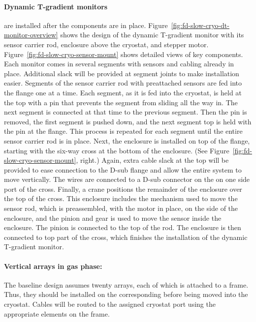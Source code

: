 \paragraph{Dynamic T-gradient monitors} %
are installed
after the  components are in place.
Figure~\ref{fig:fd-slow-cryo-dt-monitor-overview} shows the
design of the dynamic T-gradient monitor with its sensor carrier rod,
enclosure above the cryostat, and stepper motor. 
 Figure~\ref{fig:fd-slow-cryo-sensor-mount} shows detailed views of key
components.  Each monitor %
comes in several segments with sensors
and cabling already in place. Additional slack will be provided at
segment joints to make installation easier. Segments of the sensor
carrier rod with preattached sensors %
are fed into the flange one
at a time. Each segment, as it is fed into the %
cryostat, is %
held at the top with a pin that prevents the segment from sliding all
the way in. %
The next segment %
is connected at that
time to the previous segment. Then the pin %
is removed, the first
segment %
is pushed down, and the next segment top %
is held
with the pin at the flange. This process %
is repeated for each
segment %
until the entire sensor carrier rod is in
place.  Next, the enclosure %
is installed on top of the flange,
starting with the six-way cross at the bottom of the enclosure.  (See
 Figure~\ref{fig:fd-slow-cryo-sensor-mount}, right.)  Again, extra cable
slack at the top will be provided to ease connection to the D-sub
flange and allow the entire system to move vertically.  The wires
are connected to a D-sub connector on the \fdth on one side port
of the cross. Finally, a crane %
positions the remainder
of the enclosure over the top of the cross.  This enclosure includes
the mechanism used to move the sensor rod, which %
is preassembled,
with the motor in place, on the side of the enclosure, and the pinion
and gear is used to move the sensor inside the enclosure.  The pinion
is connected to the top of the rod. The enclosure is then %
connected to top part of the cross, which finishes the installation of
the dynamic T-gradient monitor.


\paragraph{Vertical arrays in gas phase:} The baseline design assumes twenty arrays, each of which is attached to a  frame. Thus, they should be installed on the corresponding  before being moved into the cryostat. Cables will be routed to the assigned cryostat port using the appropriate elements on the  frame. 

